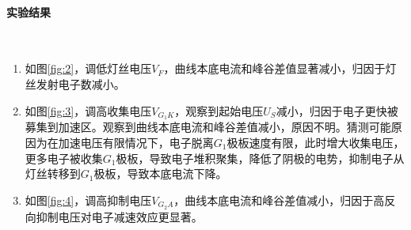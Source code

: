 \documentclass[12pt,a4paper,UTF8]{ctexart}
\begin{document}
		\paragraph{实验结果}~
		\newline
		\indent
		\begin{enumerate}[label=\arabic*.]
			\item 如图\ref{fig:2}，调低灯丝电压$V_F$，曲线本底电流和峰谷差值显著减小，归因于灯丝发射电子数减小。
			\item 如图\ref{fig:3}，调高收集电压$V_{G_1K}$，观察到起始电压$U_S$减小，归因于电子更快被募集到加速区。观察到曲线本底电流和峰谷差值减小，原因不明。猜测可能原因为在加速电压有限情况下，电子脱离$G_1$极板速度有限，此时增大收集电压，更多电子被收集$G_1$极板，导致电子堆积聚集，降低了阴极的电势，抑制电子从灯丝转移到$G_1$极板，导致本底电流下降。
			\item 如图\ref{fig:4}，调高抑制电压$V_{G_2A}$，曲线本底电流和峰谷差值减小，归因于高反向抑制电压对电子减速效应更显著。
		\end{enumerate}
\end{document}
